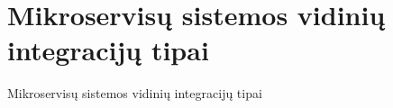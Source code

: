 \section{Mikroservisų sistemos vidinių integracijų tipai}
Mikroservisų sistemos vidinių integracijų tipai

